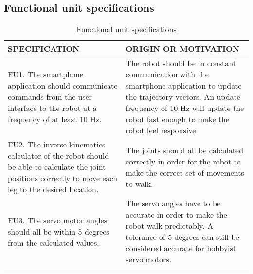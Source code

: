 \subsection*{Functional unit specifications}

\begin{center}
\begin{longtable}{|p{7.5cm}|p{7.5cm}|}
\hline
  \textbf{SPECIFICATION} & \textbf{ORIGIN OR MOTIVATION} \\
\hline FU1. The smartphone application should communicate commands from the user interface to the robot at a frequency of at least 10 Hz.
   & The robot should be in constant communication with the smartphone application to update the trajectory vectors. An update frequency of 10 Hz will update the robot fast enough to make the robot feel responsive.
\\
\hline FU2. The inverse kinematics calculator of the robot should be able to calculate the joint positions correctly to move each leg to the desired location.
   & The joints should all be calculated correctly in order for the robot to make the correct set of movements to walk.
   \\
\hline FU3. The servo motor angles should all be within 5 degrees from the calculated values.
& The servo angles have to be accurate in order to make the robot walk predictably. A tolerance of 5 degrees can still be considered accurate for hobbyist servo motors.
\\
\hline
\caption{Functional unit specifications}
\end{longtable}
\end{center}

\newpage



